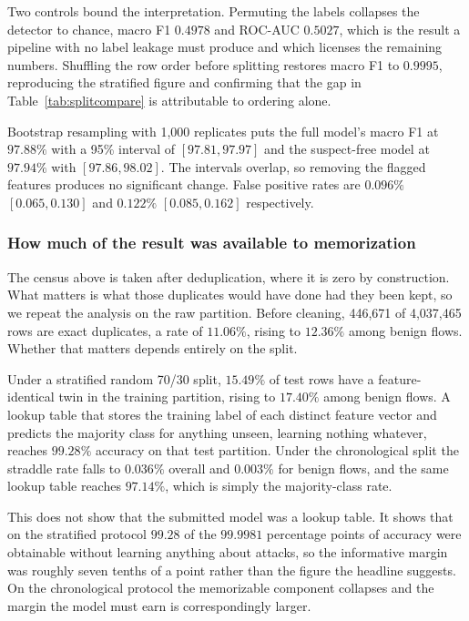 \documentclass{ieeeaccess}
\begin{document}
Two controls bound the interpretation. Permuting the labels collapses the
detector to chance, macro F1 $0.4978$ and ROC-AUC $0.5027$, which is the result a
pipeline with no label leakage must produce and which licenses the remaining
numbers. Shuffling the row order before splitting restores macro F1 to
$0.9995$, reproducing the stratified figure and confirming that the gap in
Table~\ref{tab:splitcompare} is attributable to ordering alone.

Bootstrap resampling with 1{,}000 replicates puts the full model's macro F1 at
$97.88\%$ with a 95\% interval of $[97.81, 97.97]$ and the suspect-free model at
$97.94\%$ with $[97.86, 98.02]$. The intervals overlap, so removing the flagged
features produces no significant change. False positive rates are
$0.096\%$ $[0.065, 0.130]$ and $0.122\%$ $[0.085, 0.162]$ respectively.

\subsubsection{How much of the result was available to memorization}
\label{sec:memorization}
The census above is taken after deduplication, where it is zero by
construction. What matters is what those duplicates would have done had they been
kept, so we repeat the analysis on the raw partition. Before cleaning, 446,671 of
4,037,465 rows are exact duplicates, a rate of $11.06\%$, rising to $12.36\%$
among benign flows. Whether that matters depends entirely on the split.

Under a stratified random 70/30 split, $15.49\%$ of test rows have a
feature-identical twin in the training partition, rising to $17.40\%$ among
benign flows. A lookup table that stores the training label of each distinct
feature vector and predicts the majority class for anything unseen, learning
nothing whatever, reaches $99.28\%$ accuracy on that test partition. Under the
chronological split the straddle rate falls to $0.036\%$ overall and $0.003\%$
for benign flows, and the same lookup table reaches $97.14\%$, which is simply
the majority-class rate.

This does not show that the submitted model was a lookup table. It shows that on
the stratified protocol $99.28$ of the $99.9981$ percentage points of accuracy
were obtainable without learning anything about attacks, so the informative
margin was roughly seven tenths of a point rather than the figure the headline
suggests. On the chronological protocol the memorizable component collapses and
the margin the model must earn is correspondingly larger.
\end{document}
